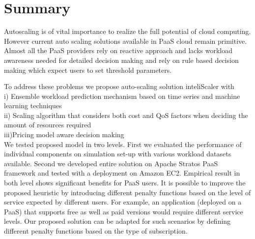 \section{Summary}

Autoscaling is of vital importance to realize the full potential of cloud computing. However current auto scaling solutions available in PaaS cloud remain primitive. Almost all the PaaS providers rely on reactive approach and lacks workload awareness needed for detailed decision making and rely on rule based decision making which expect users to set threshold parameters. 

To address these problems we propose auto-scaling solution inteliScaler with\\
i)  Ensemble workload prediction mechanism based on time series and machine learning techniques \\ 
ii) Scaling algorithm that considers both cost and QoS factors when deciding the amount of resources required\\
iii)Pricing model aware decision making\\

We tested proposed model in two levels. First we evaluated the performance of individual components on simulation set-up with various workload datasets available. Second we developed entire solution on Apache Stratos PaaS framework and tested with a deployment on Amazon EC2. Empirical result in both level shows significant benefits for PaaS users. It is possible to improve the proposed heuristic by introducing different penalty functions  based on the level of service expected by different users. For example, an application (deployed on a PaaS) that supports free as well as paid versions would require different service levels. Our proposed solution can be adapted for such scenarios by defining different penalty functions based on the type of subscription.



